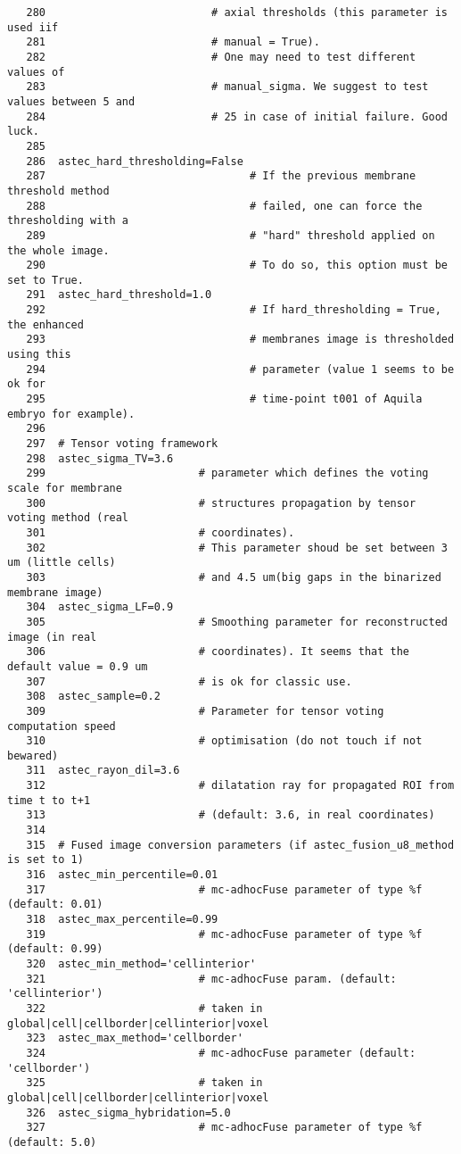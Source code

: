 \begin{verbatim}
   280							# axial thresholds (this parameter is used iif 
   281							# manual = True).
   282							# One may need to test different values of 
   283							# manual_sigma. We suggest to test values between 5 and
   284							# 25 in case of initial failure. Good luck.
   285	
   286	astec_hard_thresholding=False 
   287	                              # If the previous membrane threshold method 
   288								  # failed, one can force the thresholding with a
   289								  # "hard" threshold applied on the whole image. 
   290								  # To do so, this option must be set to True.
   291	astec_hard_threshold=1.0      
   292	                              # If hard_thresholding = True, the enhanced 
   293								  # membranes image is thresholded using this 
   294								  # parameter (value 1 seems to be ok for 
   295								  # time-point t001 of Aquila embryo for example).
   296	
   297	# Tensor voting framework
   298	astec_sigma_TV=3.6    
   299	                      # parameter which defines the voting scale for membrane
   300						  # structures propagation by tensor voting method (real
   301						  # coordinates). 
   302					 	  # This parameter shoud be set between 3 um (little cells)
   303					 	  # and 4.5 um(big gaps in the binarized membrane image)
   304	astec_sigma_LF=0.9    
   305	                      # Smoothing parameter for reconstructed image (in real
   306						  # coordinates). It seems that the default value = 0.9 um
   307						  # is ok for classic use.
   308	astec_sample=0.2      
   309	                      # Parameter for tensor voting computation speed 
   310						  # optimisation (do not touch if not bewared)
   311	astec_rayon_dil=3.6   
   312	                      # dilatation ray for propagated ROI from time t to t+1
   313						  # (default: 3.6, in real coordinates) 
   314	
   315	# Fused image conversion parameters (if astec_fusion_u8_method is set to 1)
   316	astec_min_percentile=0.01   
   317	                      # mc-adhocFuse parameter of type %f (default: 0.01)
   318	astec_max_percentile=0.99   
   319	                      # mc-adhocFuse parameter of type %f (default: 0.99)
   320	astec_min_method='cellinterior'
   321	                      # mc-adhocFuse param. (default: 'cellinterior')
   322					      # taken in global|cell|cellborder|cellinterior|voxel
   323	astec_max_method='cellborder'
   324	                      # mc-adhocFuse parameter (default: 'cellborder')
   325						  # taken in global|cell|cellborder|cellinterior|voxel
   326	astec_sigma_hybridation=5.0 
   327	                      # mc-adhocFuse parameter of type %f (default: 5.0)

\end{verbatim}
